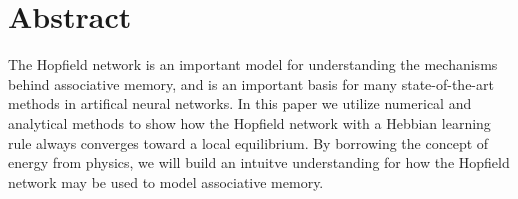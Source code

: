 \section{Abstract}
The Hopfield network is an important model for understanding the mechanisms behind associative memory, and is an important basis for many state-of-the-art methods in artifical neural networks. In this paper we utilize numerical and analytical methods to show how the Hopfield network with a Hebbian learning rule always converges toward a local equilibrium. By borrowing the concept of energy from physics, we will build an intuitve understanding for how the Hopfield network may be used to model associative memory.  